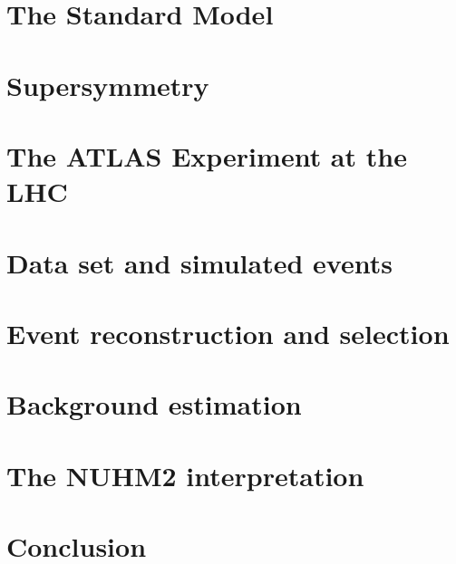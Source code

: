 \documentclass[hyperlinks]{outhesis}
\begin{document}
\chapter{The Standard Model}
\label{chapter:standard_model}
\graphicspath{{figures/standard_model/}}



\chapter{Supersymmetry}
\label{chapter:Supersymmetry}
\graphicspath{{figures/susy/}}



\chapter{The ATLAS Experiment at the LHC}
\label{chapter:altas_experiment}
\graphicspath{{figures/atlas_experiment/}}



\chapter{Data set and simulated events}
\label{chapter:data}
\graphicspath{{figures/data/}}


\chapter{Event reconstruction and selection}
\label{chapter:event_reconstruction_and_selection}
\graphicspath{{figures/event_reconstruction/}}


\chapter{Background estimation}
\label{chapter:bkg_estimation}
\graphicspath{{figures/bkg_estimation/}}


\chapter{The NUHM2 interpretation}
\label{chapter:results}
\graphicspath{{figures/results/}}


\chapter{Conclusion}
\label{chapter:conclusion}
\graphicspath{{figures/conclusion/}}

\end{document}

